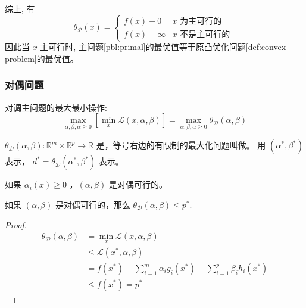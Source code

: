 综上, 有
$$
\theta_{\mathcal{P}}(x)=\left\{\begin{array}{ll}
f(x)+0 & x \text { 为主可行的 } \\
f(x)+\infty & x \text { 不是主可行的 }
\end{array}\right.
$$
因此当 $ x $ 主可行时, 主问题\ref{pbl:primal}的最优值等于原凸优化问题\ref{def:convex-problem}的最优值。

\subsubsection{对偶问题}

\begin{definition}[对偶问题]
    对调主问题的最大最小操作:
$$
\max _{\alpha, \beta, \alpha \geqslant 0}\left[\min _{x} \mathcal{L}(x, \alpha, \beta)\right]=\max _{\alpha, \beta, \alpha \geqslant 0} \theta_{\mathcal{D}}(\alpha, \beta)
$$

$ \theta_{\mathcal{D}}(\alpha, \beta): \mathbb{R}^{m} \times \mathbb{R}^{p} \rightarrow \mathbb{R} $ 是，等号右边的有限制的最大化问题叫做。 用 $ \left(\alpha^{*}, \beta^{*}\right) $ 表示， $ d^{*}=\theta_{\mathcal{D}}\left(\alpha^{*}, \beta^{*}\right) $ 表示。
\end{definition}

\begin{definition}[对偶可行]
    如果 $ \alpha_{i}(x) \geqslant 0 $ ，$ (\alpha, \beta) $ 是对偶可行的。
\end{definition}


\begin{theorem}
    如果 $ (\alpha, \beta) $ 是对偶可行的，那么 $ \theta_{\mathcal{D}}(\alpha, \beta) \leqslant p^{*} $.
\end{theorem}

\begin{proof}
    $$ \begin{aligned} \theta_{\mathcal{D}}(\alpha, \beta) &=\min _{x} \mathcal{L}(x, \alpha, \beta) \\ & \leqslant \mathcal{L}\left(x^{*}, \alpha, \beta\right) \\ &=f\left(x^{*}\right)+\sum_{i=1}^{m} \alpha_{i} g_{i}\left(x^{*}\right)+\sum_{i=1}^{p} \beta_{i} h_{i}\left(x^{*}\right) \\ & \leqslant f\left(x^{*}\right)=p^{*} \end{aligned} $$
\end{proof}

